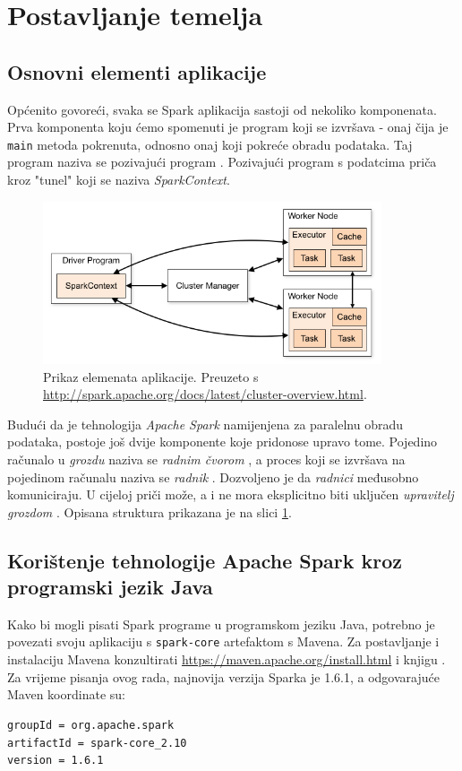\documentclass[times, utf8, zavrsni, numeric]{fer}
\begin{document}
\section{Postavljanje temelja}
\subsection{Osnovni elementi aplikacije}
Općenito govoreći, svaka se Spark aplikacija sastoji  od nekoliko komponenata. Prva komponenta koju ćemo spomenuti je program koji se izvršava - onaj čija je \texttt{main} metoda pokrenuta, odnosno onaj koji pokreće obradu podataka. Taj program naziva se pozivajući program . Pozivajući program s podatcima priča kroz "tunel" koji se naziva \emph{SparkContext}.

\begin{figure}[htb]
\centering
\includegraphics[width=10cm]{img/cluster-overview.png}
\caption{Prikaz elemenata aplikacije. Preuzeto s \protect\url{http://spark.apache.org/docs/latest/cluster-overview.html}.}
\label{fig:cluster-overview}
\end{figure}

Budući da je tehnologija \emph{Apache Spark} namijenjena za paralelnu obradu podataka, postoje još dvije komponente koje pridonose upravo tome. Pojedino računalo u \emph{grozdu}  naziva se \emph{radnim čvorom} , a proces koji se izvršava na pojedinom računalu naziva se \emph{radnik} . Dozvoljeno je da \emph{radnici} međusobno komuniciraju. U cijeloj priči može, a i ne mora eksplicitno biti uključen \emph{upravitelj grozdom} .
Opisana struktura prikazana je na slici \ref{fig:cluster-overview}.

\subsection{Korištenje tehnologije Apache Spark kroz programski jezik Java}
Kako bi mogli pisati Spark programe u programskom jeziku Java, potrebno je povezati svoju aplikaciju s \texttt{spark-core} artefaktom s Mavena. Za postavljanje i instalaciju Mavena konzultirati \url{https://maven.apache.org/install.html} i knjigu \cite{marcupic}. Za vrijeme pisanja ovog rada, najnovija verzija Sparka je 1.6.1, a odgovarajuće Maven koordinate su:
\begin{lstlisting}[language=bash, basicstyle=\small]
groupId = org.apache.spark
artifactId = spark-core_2.10
version = 1.6.1
\end{lstlisting}
\end{document}
